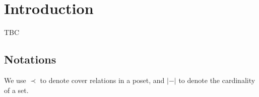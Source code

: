 
\section*{Introduction} 
\label{s:introduction}

TBC


\subsection*{Notations}

We use $\prec$ to denote cover relations in a poset, and $|-|$ to denote the cardinality of a set.